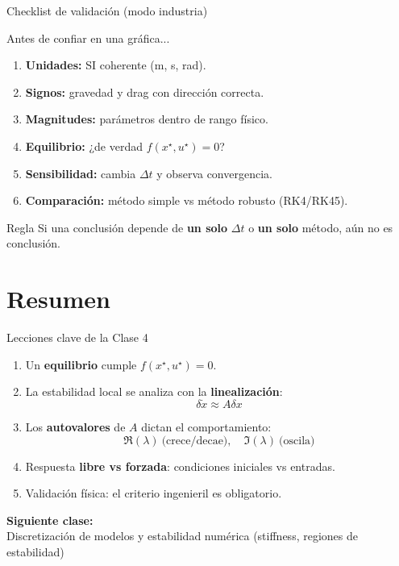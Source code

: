 \documentclass[aspectratio=169,10pt]{beamer}
\newcommand{\importantbox}[2][Importante]{%
\begin{alertblock}{#1}#2\end{alertblock}}
\begin{document}
\begin{frame}{Checklist de validación (modo industria)}
\small

\begin{block}{Antes de confiar en una gráfica...}
\begin{enumerate}
\item \textbf{Unidades:} SI coherente (m, s, rad).
\item \textbf{Signos:} gravedad y drag con dirección correcta.
\item \textbf{Magnitudes:} parámetros dentro de rango físico.
\item \textbf{Equilibrio:} ¿de verdad $f(x^\star,u^\star)=0$?
\item \textbf{Sensibilidad:} cambia $\Delta t$ y observa convergencia.
\item \textbf{Comparación:} método simple vs método robusto (RK4/RK45).
\end{enumerate}
\end{block}

\importantbox[Regla]{
Si una conclusión depende de \textbf{un solo} $\Delta t$ o \textbf{un solo} método, aún no es conclusión.
}

\end{frame}

\section{Resumen}

\begin{frame}{Lecciones clave de la Clase 4}
\small

\begin{enumerate}
\item Un \textbf{equilibrio} cumple $f(x^\star,u^\star)=0$.
\item La estabilidad local se analiza con la \textbf{linealización}:
\[
\delta \dot{x} \approx A\delta x
\]
\item Los \textbf{autovalores} de $A$ dictan el comportamiento:
\[
\Re(\lambda)\ \text{(crece/decae)},\quad \Im(\lambda)\ \text{(oscila)}
\]
\item Respuesta \textbf{libre vs forzada}: condiciones iniciales vs entradas.
\item Validación física: el criterio ingenieril es obligatorio.
\end{enumerate}

\vspace{4mm}

\begin{center}
\Large \textcolor{aerospace_blue}{\textbf{Siguiente clase:}}\\
\large Discretización de modelos y estabilidad numérica (stiffness, regiones de estabilidad)
\end{center}

\end{frame}
\end{document}
